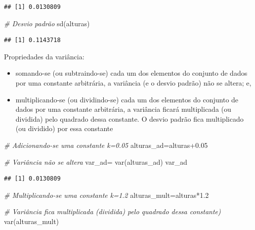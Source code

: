 \documentclass[
]{book}
\newenvironment{Shaded}{\begin{snugshade}}{\end{snugshade}}
\newcommand{\CommentTok}[1]{\textcolor[rgb]{0.56,0.35,0.01}{\textit{#1}}}
\newcommand{\FloatTok}[1]{\textcolor[rgb]{0.00,0.00,0.81}{#1}}
\newcommand{\FunctionTok}[1]{\textcolor[rgb]{0.00,0.00,0.00}{#1}}
\newcommand{\NormalTok}[1]{#1}
\newcommand{\OtherTok}[1]{\textcolor[rgb]{0.56,0.35,0.01}{#1}}
\newcommand{\SpecialCharTok}[1]{\textcolor[rgb]{0.00,0.00,0.00}{#1}}
\providecommand{\tightlist}{%
  \setlength{\itemsep}{0pt}\setlength{\parskip}{0pt}}
\begin{document}
\begin{verbatim}
## [1] 0.0130809
\end{verbatim}

\begin{Shaded}
\begin{Highlighting}[]
\CommentTok{\# Desvio padrão}
\FunctionTok{sd}\NormalTok{(alturas) }
\end{Highlighting}
\end{Shaded}

\begin{verbatim}
## [1] 0.1143718
\end{verbatim}

Propriedades da variância:

\begin{itemize}
\tightlist
\item
  somando-se (ou subtraindo-se) cada um dos elementos do conjunto de dados por uma constante arbitrária, a variância (e o desvio padrão) não se altera; e,
\item
  multiplicando-se (ou dividindo-se) cada um dos elementos do conjunto de dados por uma constante arbitrária, a variância ficará multiplicada (ou dividida) pelo quadrado dessa constante. O desvio padrão fica multiplicado (ou dividido) por essa constante
\end{itemize}

\begin{Shaded}
\begin{Highlighting}[]
\CommentTok{\# Adicionando{-}se uma constante k=0.05}
\NormalTok{alturas\_ad}\OtherTok{=}\NormalTok{alturas}\FloatTok{+0.05}

\CommentTok{\# Variância não se altera}
\NormalTok{var\_ad}\OtherTok{=} \FunctionTok{var}\NormalTok{(alturas\_ad)}
\NormalTok{var\_ad}
\end{Highlighting}
\end{Shaded}

\begin{verbatim}
## [1] 0.0130809
\end{verbatim}

\begin{Shaded}
\begin{Highlighting}[]
\CommentTok{\# Multiplicando{-}se uma constante k=1.2}
\NormalTok{alturas\_mult}\OtherTok{=}\NormalTok{alturas}\SpecialCharTok{*}\FloatTok{1.2}

\CommentTok{\# Variância fica multiplicada (dividida) pelo quadrado dessa constante)}
\FunctionTok{var}\NormalTok{(alturas\_mult)}
\end{Highlighting}
\end{Shaded}
\end{document}
